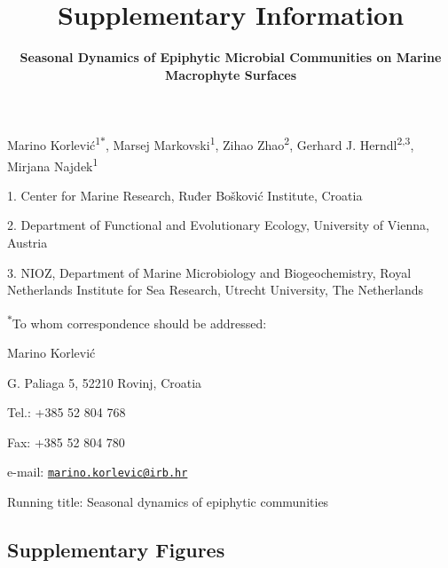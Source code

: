 \documentclass[12pt,]{article}
\title{\textbf{Supplementary Information}}
\subtitle{\textbf{Seasonal Dynamics of Epiphytic Microbial Communities on Marine
Macrophyte Surfaces}}
\author{}
\date{}
\begin{document}
\maketitle

\vspace{20mm}

Marino Korlević\textsuperscript{1\(*\)}, Marsej
Markovski\textsuperscript{1}, Zihao Zhao\textsuperscript{2}, Gerhard J.
Herndl\textsuperscript{2,3}, Mirjana Najdek\textsuperscript{1}

1. Center for Marine Research, Ruđer Bošković Institute, Croatia

2. Department of Functional and Evolutionary Ecology, University of
Vienna, Austria

3. NIOZ, Department of Marine Microbiology and Biogeochemistry, Royal
Netherlands Institute for Sea Research, Utrecht University, The
Netherlands

\textsuperscript{\(*\)}To whom correspondence should be addressed:

Marino Korlević

G. Paliaga 5, 52210 Rovinj, Croatia

Tel.: +385 52 804 768

Fax: +385 52 804 780

e-mail:
\href{mailto:marino.korlevic@irb.hr}{\nolinkurl{marino.korlevic@irb.hr}}

Running title: Seasonal dynamics of epiphytic communities

\linenumbers
{}
\setlength\parindent{24pt}

\hypertarget{supplementary-figures}{%
\subsection{Supplementary Figures}\label{supplementary-figures}}
\end{document}
